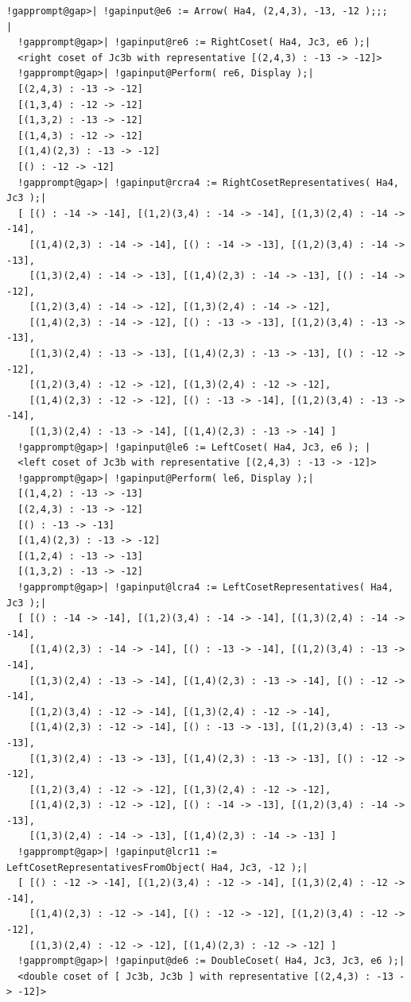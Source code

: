 \documentclass[a4paper,11pt]{report}
\begin{document}
{{\begin{Verbatim}[commandchars=!@|,fontsize=\small,frame=single,label=Example]
  !gapprompt@gap>| !gapinput@e6 := Arrow( Ha4, (2,4,3), -13, -12 );;;                            |
  !gapprompt@gap>| !gapinput@re6 := RightCoset( Ha4, Jc3, e6 );|
  <right coset of Jc3b with representative [(2,4,3) : -13 -> -12]>
  !gapprompt@gap>| !gapinput@Perform( re6, Display );|
  [(2,4,3) : -13 -> -12]
  [(1,3,4) : -12 -> -12]
  [(1,3,2) : -13 -> -12]
  [(1,4,3) : -12 -> -12]
  [(1,4)(2,3) : -13 -> -12]
  [() : -12 -> -12]
  !gapprompt@gap>| !gapinput@rcra4 := RightCosetRepresentatives( Ha4, Jc3 );|
  [ [() : -14 -> -14], [(1,2)(3,4) : -14 -> -14], [(1,3)(2,4) : -14 -> -14], 
    [(1,4)(2,3) : -14 -> -14], [() : -14 -> -13], [(1,2)(3,4) : -14 -> -13], 
    [(1,3)(2,4) : -14 -> -13], [(1,4)(2,3) : -14 -> -13], [() : -14 -> -12], 
    [(1,2)(3,4) : -14 -> -12], [(1,3)(2,4) : -14 -> -12], 
    [(1,4)(2,3) : -14 -> -12], [() : -13 -> -13], [(1,2)(3,4) : -13 -> -13], 
    [(1,3)(2,4) : -13 -> -13], [(1,4)(2,3) : -13 -> -13], [() : -12 -> -12], 
    [(1,2)(3,4) : -12 -> -12], [(1,3)(2,4) : -12 -> -12], 
    [(1,4)(2,3) : -12 -> -12], [() : -13 -> -14], [(1,2)(3,4) : -13 -> -14], 
    [(1,3)(2,4) : -13 -> -14], [(1,4)(2,3) : -13 -> -14] ]
  !gapprompt@gap>| !gapinput@le6 := LeftCoset( Ha4, Jc3, e6 ); |
  <left coset of Jc3b with representative [(2,4,3) : -13 -> -12]>
  !gapprompt@gap>| !gapinput@Perform( le6, Display );|
  [(1,4,2) : -13 -> -13]
  [(2,4,3) : -13 -> -12]
  [() : -13 -> -13]
  [(1,4)(2,3) : -13 -> -12]
  [(1,2,4) : -13 -> -13]
  [(1,3,2) : -13 -> -12]
  !gapprompt@gap>| !gapinput@lcra4 := LeftCosetRepresentatives( Ha4, Jc3 );|
  [ [() : -14 -> -14], [(1,2)(3,4) : -14 -> -14], [(1,3)(2,4) : -14 -> -14], 
    [(1,4)(2,3) : -14 -> -14], [() : -13 -> -14], [(1,2)(3,4) : -13 -> -14], 
    [(1,3)(2,4) : -13 -> -14], [(1,4)(2,3) : -13 -> -14], [() : -12 -> -14], 
    [(1,2)(3,4) : -12 -> -14], [(1,3)(2,4) : -12 -> -14], 
    [(1,4)(2,3) : -12 -> -14], [() : -13 -> -13], [(1,2)(3,4) : -13 -> -13], 
    [(1,3)(2,4) : -13 -> -13], [(1,4)(2,3) : -13 -> -13], [() : -12 -> -12], 
    [(1,2)(3,4) : -12 -> -12], [(1,3)(2,4) : -12 -> -12], 
    [(1,4)(2,3) : -12 -> -12], [() : -14 -> -13], [(1,2)(3,4) : -14 -> -13], 
    [(1,3)(2,4) : -14 -> -13], [(1,4)(2,3) : -14 -> -13] ]
  !gapprompt@gap>| !gapinput@lcr11 := LeftCosetRepresentativesFromObject( Ha4, Jc3, -12 );|
  [ [() : -12 -> -14], [(1,2)(3,4) : -12 -> -14], [(1,3)(2,4) : -12 -> -14], 
    [(1,4)(2,3) : -12 -> -14], [() : -12 -> -12], [(1,2)(3,4) : -12 -> -12], 
    [(1,3)(2,4) : -12 -> -12], [(1,4)(2,3) : -12 -> -12] ]
  !gapprompt@gap>| !gapinput@de6 := DoubleCoset( Ha4, Jc3, Jc3, e6 );|
  <double coset of [ Jc3b, Jc3b ] with representative [(2,4,3) : -13 -> -12]>

\end{Verbatim}}}
\end{document}
